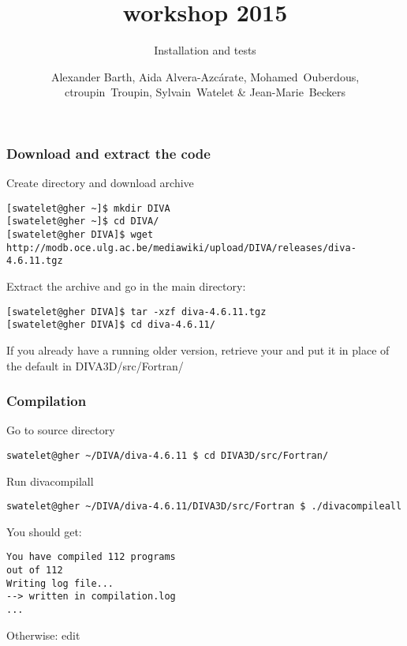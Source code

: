 
\parindent 0cm

\author[Alexander Barth, Aida Alvera-Azc\'{a}rate, Mohamed~Ouberdous, ctroupin~Troupin, Sylvain~Watelet \& Jean-Marie~Beckers]{Alexander Barth, Aida Alvera-Azc\'{a}rate, Mohamed~Ouberdous,\\
 ctroupin~Troupin, Sylvain~Watelet \& Jean-Marie~Beckers}
  
\title[]{\diva workshop 2015}
\subtitle{Installation and tests}
\date{}


\maketitlepage %

\begin{frame}[fragile]
\frametitle{Download and extract the code}
\footnotesize

Create directory and download \diva archive 
\begin{lstlisting}[style=Bash]
[swatelet@gher ~]$ mkdir DIVA
[swatelet@gher ~]$ cd DIVA/
[swatelet@gher DIVA]$ wget http://modb.oce.ulg.ac.be/mediawiki/upload/DIVA/releases/diva-4.6.11.tgz
\end{lstlisting}

Extract the archive and go in the main directory:
\begin{lstlisting}[style=Bash]
[swatelet@gher DIVA]$ tar -xzf diva-4.6.11.tgz
[swatelet@gher DIVA]$ cd diva-4.6.11/
\end{lstlisting}
If you already have a running older version, retrieve your  and put it in place of the default in DIVA3D/src/Fortran/
\end{frame}

\begin{frame}[fragile]
\frametitle{Compilation}
\footnotesize

Go to source directory
\begin{lstlisting}[style=Bash]
swatelet@gher ~/DIVA/diva-4.6.11 $ cd DIVA3D/src/Fortran/
\end{lstlisting}

Run divacompilall \Coffeecup
\begin{lstlisting}[style=Bash]
swatelet@gher ~/DIVA/diva-4.6.11/DIVA3D/src/Fortran $ ./divacompileall
\end{lstlisting}

You should get:\\
\begin{verbatim}
You have compiled 112 programs
out of 112
Writing log file...
--> written in compilation.log
...
\end{verbatim}

Otherwise: edit 

\end{frame}

